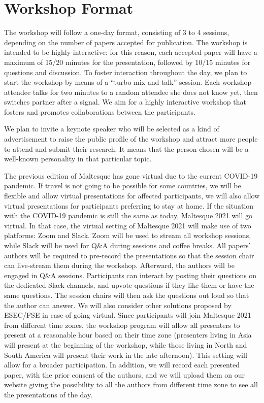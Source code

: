 
\section{Workshop Format}
\label{sec:format}

The workshop will follow a one-day format, consisting of 3 to 4 sessions, depending on the number of papers accepted for publication.
The workshop is intended to be highly interactive: for this reason, each accepted paper will have a maximum of 15/20 minutes for the presentation, followed by 10/15 minutes for questions and discussion.
To foster interaction throughout the day, we plan to start the workshop by means of a “turbo mix-and-talk” session. Each workshop attendee talks for two minutes to a random attendee she does not know yet, then switches partner after a signal. We aim for a highly interactive workshop that fosters and promotes collaborations between the participants. %

We plan to invite a keynote speaker who will be selected as a kind of advertisement to raise the public profile of the workshop and attract more people to attend and submit their research. It means that the person chosen will be a well-known personality in that particular topic. 

The previous edition of Maltesque has gone virtual due to the current COVID-19 pandemic. If travel is not going to be possible for some countries, we will be flexible and allow virtual presentations for affected participants, we will also allow virtual presentations for participants preferring to stay at home. If the situation with the COVID-19 pandemic is still the same as today, Maltesque 2021 will go virtual. In that case, the virtual setting of Maltesque 2021 will make use of two platforms: Zoom and Slack. Zoom will be used to stream all workshop sessions, while Slack will be used for Q\&A during sessions and coffee breaks. All papers' authors will be required to pre-record the presentations so that the session chair can live-stream them during the workshop. Afterward, the authors will be engaged in Q\&A sessions. Participants can interact by posting their questions on the dedicated Slack channels, and upvote questions if they like them or have the same questions. The session chairs will then ask the questions out loud so that the author can answer. We will also consider other solutions proposed by ESEC/FSE in case of going virtual.
Since participants will join Maltesque 2021 from different time zones, the workshop program will allow all presenters to present at a reasonable hour based on their time zone (\ie presenters living in Asia will present at the beginning of the workshop, while those living in North and South America will present their work in the late afternoon). This setting will allow for a broader participation. In addition, we will record each presented paper, with the prior consent of the authors, and we will upload them on our website giving the possibility to all the authors from different time zone to see all the presentations of the day.